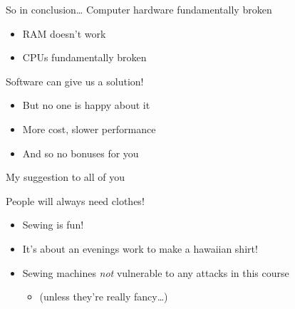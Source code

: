 \documentclass[9pt,aspectratio=169]{beamer}
\begin{document}
\begin{frame}[label={sec:org1e2cf2c}]{So in conclusion\ldots{}}
Computer hardware fundamentally broken
\begin{itemize}
\item RAM doesn't work
\item CPUs fundamentally broken
\end{itemize}

Software can give us a solution!
\begin{itemize}
\item But no one is happy about it
\item More cost, slower performance
\item And so no bonuses for you
\end{itemize}
\end{frame}

\begin{frame}[label={sec:orgb0a7027}]{My suggestion to all of you}
\begin{block}{People will always need clothes!}
\begin{itemize}
\item Sewing is fun!
\item It's about an evenings work to make a hawaiian shirt!
\item Sewing machines \emph{not} vulnerable to any attacks in this course
\begin{itemize}
\item (unless they're really fancy\ldots{})
\end{itemize}
\end{itemize}
\end{block}
\end{frame}
\end{document}
